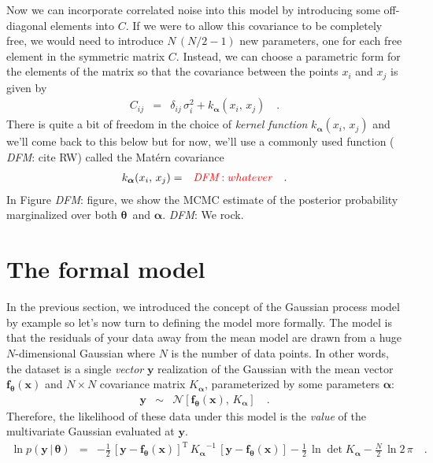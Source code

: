 \documentclass[12pt,preprint]{aastex}
\newcommand{\eqlabel}[1]{\label{eq:#1}}
\newcommand{\sectlabel}[1]{\label{sect:#1}}
\newcommand{\bvec}[1]{{\ensuremath{\boldsymbol{#1}}}}
\newcommand{\todo}[3]{{\color{#2} \emph{#1}: #3}}
\newcommand{\dfmtodo}[1]{\todo{DFM}{red}{#1}}
\newcommand{\params}{{\ensuremath{\boldsymbol{\theta}}}}
\newcommand{\hyperpar}{{\ensuremath{\alpha}}}
\newcommand{\hyperpars}{{\ensuremath{\boldsymbol{\hyperpar}}}}
\begin{document}
Now we can incorporate correlated noise into this model by introducing some
off-diagonal elements into $C$.
If we were to allow this covariance to be completely free, we would need to
introduce $N\,(N/2-1)$ new parameters, one for each free element in the
symmetric matrix $C$.
Instead, we can choose a parametric form for the elements of the matrix so
that the covariance between the points $x_i$ and $x_j$ is given by
\begin{eqnarray}
C_{ij} &=& \delta_{ij}\,\sigma_i^2 + k_\hyperpars(x_i,\,x_j) \quad.
\end{eqnarray}
There is quite a bit of freedom in the choice of \emph{kernel function}
$k_\hyperpars(x_i,\,x_j)$ and we'll come back to this below but for now, we'll
use a commonly used function (\dfmtodo{cite RW}) called the Mat\'ern
covariance
\begin{eqnarray}
k_\hyperpars(x_i,\,x_j) &=& \dfmtodo{whatever} \quad.
\end{eqnarray}
In Figure \dfmtodo{figure}, we show the MCMC estimate of the posterior
probability marginalized over both \params\ and \hyperpars.
\dfmtodo{We rock.}


\section{The formal model}
\sectlabel{formal}

In the previous section, we introduced the concept of the Gaussian process
model by example so let's now turn to defining the model more formally.
The model is that the residuals of your data away from the mean model are
drawn from a huge $N$-dimensional Gaussian where $N$ is the number of data
points.
In other words, the dataset is a single \emph{vector} $\bvec{y}$ realization
of the Gaussian with the mean vector $\bvec{f}_\params(\bvec{x})$ and
$N \times N$ covariance matrix $K_\bvec{\alpha}$, parameterized by some
parameters \bvec{\alpha}:
\begin{eqnarray}
\bvec{y} &\sim& \mathcal{N}\left[\bvec{f}_\params(\bvec{x}),\,
    K_\bvec{\alpha}\right] \quad.
\end{eqnarray}
Therefore, the likelihood of these data under this model is the \emph{value}
of the multivariate Gaussian evaluated at \bvec{y}.
\begin{eqnarray}\eqlabel{simple-gp-lnlike-2}
\ln p (\bvec{y}\,|\,\params) &=&
-\frac{1}{2}\,\left[\bvec{y}-\bvec{f}_\params(\bvec{x})\right]^\mathrm{T}\,
{K_\bvec{\alpha}}^{-1}\,\left [\bvec{y} - \bvec{f}_\params(\bvec{x})\right ]
-\frac{1}{2}\,\ln\det K_\bvec{\alpha} - \frac{N}{2}\,\ln 2\,\pi \quad.
\end{eqnarray}
\end{document}
